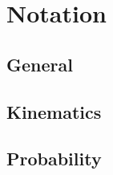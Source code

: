 \documentclass[10pt,twoside,a4paper]{report}
\begin{document}
\section*{Notation}

\subsection*{General}


\subsection*{Kinematics}


\subsection*{Probability}

\end{document}
